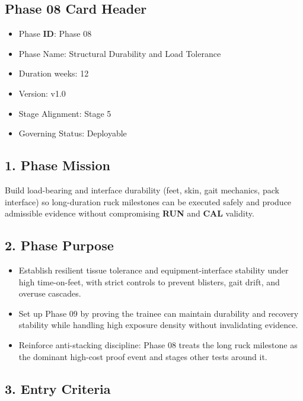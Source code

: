 \documentclass[10pt]{article}
\begin{document}
\subsection*{Phase 08 Card Header}
{}

\begin{itemize}
\item Phase \textbf{ID}: Phase 08
\item Phase Name: Structural Durability and Load Tolerance
\item Duration weeks: 12
\item Version: v1.0
\item Stage Alignment: Stage 5
\item Governing Status: Deployable
\end{itemize}

\subsection*{1. Phase Mission}


Build load-bearing and interface durability (feet, skin, gait mechanics, pack interface) so long-duration ruck milestones can be executed safely and produce admissible evidence without compromising \textbf{RUN} and \textbf{CAL} validity.

\subsection*{2. Phase Purpose}


\begin{itemize}
\item Establish resilient tissue tolerance and equipment-interface stability under high time-on-feet, with strict controls to prevent blisters, gait drift, and overuse cascades.
\item Set up Phase 09 by proving the trainee can maintain durability and recovery stability while handling high exposure density without invalidating evidence.
\item Reinforce anti-stacking discipline: Phase 08 treats the long ruck milestone as the dominant high-cost proof event and stages other tests around it.
\end{itemize}

\subsection*{3. Entry Criteria}
\end{document}
